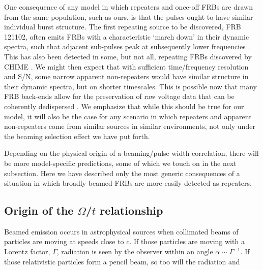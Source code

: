 \documentclass[fleqn,usenatbib]{mnras}
\begin{document}
One consequence of any model in which repeaters and 
once-off FRBs are drawn from the same population, such as ours, is that 
the pulses ought to have similar individual burst structure. 
The first repeating source to be discovered, FRB\,121102, often 
emits FRBs with a characteristic `march down' in their dynamic spectra, such that 
adjacent sub-pulses peak at subsequently lower 
frequencies \citep{hessels2019}. This has also been detected in 
some, but not all, repeating FRBs discovered by CHIME \citep{chime2019r2,chime19-8repeaters, fonseca-2020-apj}. 
We might then expect that with sufficient 
time/frequency resolution and S/N, some narrow apparent non-repeaters
would have similar structure in their dynamic spectra, but on 
shorter timescales. This is possible 
now that many FRB back-ends allow for the preservation 
of raw voltage data that can be coherently dedispersed
\citep{farah2018, chime19-8repeaters, bannister19, ravi-2019-DSA}. 
We emphasize that while this should be true for our model, 
it will also be the case for any scenario in which 
repeaters and apparent non-repeaters come from similar sources in similar environments, not only 
under the beaming selection effect we have 
put forth.

Depending on the physical origin of a beaming/pulse width 
correlation, there will be more model-specific predictions, some of 
which we touch on in the next subsection. Here we have 
described only the most generic consequences of a situation 
in which broadly beamed FRBs are more easily detected as repeaters.


\label{sect-width-omega}
\subsection{Origin of the $\Omega$/$t$ relationship}
Beamed emission occurs in astrophysical sources when collimated 
beams of particles are moving at speeds close 
to $c$. If those particles are moving 
with a Lorentz factor, $\Gamma$, radiation is seen 
by the observer within an angle $\alpha\sim\Gamma^{-1}$. 
If those relativistic particles form a pencil beam, 
so too will the radiation and 
\end{document}
